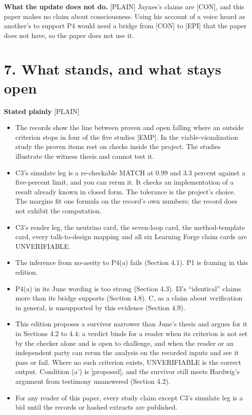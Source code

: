 \documentclass[11pt]{article}
\newcommand{\register}[1]{{\ttfamily\small #1}}
\begin{document}
\textbf{What the update does not do.} \register{[PLAIN]} Jaynes's claims are [CON], and this paper makes no claim about consciousness. Using his account of a voice heard as another's to support P4 would need a bridge from [CON] to [EPI] that the paper does not have, so the paper does not use it.

\section*{7. What stands, and what stays open}

\textbf{Stated plainly} \register{[PLAIN]}

\begin{itemize}
\item The records show the line between proven and open falling where an outside criterion stops in four of the five studies [EMP]. In the viable-visualization study the proven items rest on checks inside the project. The studies illustrate the witness thesis and cannot test it.
\item C3's simulate leg is a re-checkable MATCH at 0.99 and 3.3 percent against a five-percent limit, and you can rerun it. It checks an implementation of a result already known in closed form. The tolerance is the project's choice. The margins fit one formula on the record's own numbers; the record does not exhibit the computation.
\item C3's render leg, the neutrino card, the seven-loop card, the method-template card, every talk-to-design mapping and all six Learning Forge claim cards are UNVERIFIABLE.
\item The inference from no-aseity to P4(a) fails (Section 4.1). P1 is framing in this edition.
\item P4(a) in its June wording is too strong (Section 4.3). I3's ``identical'' claims more than its bridge supports (Section 4.8). C, as a claim about verification in general, is unsupported by this evidence (Section 4.9).
\item This edition proposes a survivor narrower than June's thesis and argues for it in Sections 4.2 to 4.4: a verdict binds for a reader when its criterion is not set by the checker alone and is open to challenge, and when the reader or an independent party can rerun the analysis on the recorded inputs and see it pass or fail. Where no such criterion exists, UNVERIFIABLE is the correct output. Condition (a') is [proposed], and the survivor still meets Hardwig's argument from testimony unanswered (Section 4.2).
\item For any reader of this paper, every study claim except C3's simulate leg is a bid until the records or hashed extracts are published.
\end{itemize}
\end{document}
